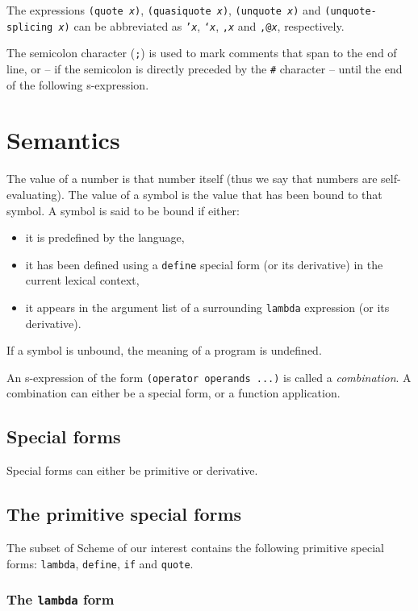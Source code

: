 The expressions \texttt{(quote \textit{x})},
\texttt{(quasiquote \textit{x})}, \texttt{(unquote \textit{x})}
and \texttt{(unquote\--splicing \textit{x})} can be abbreviated
as \texttt{'\textit{x}}, \texttt{`\textit{x}}, \texttt{,\textit{x}}
and \texttt{,@\textit{x}}, respectively.

The semicolon character (\texttt{;}) is used to mark comments that span to the
end of line, or -- if the semicolon is directly preceded by the \texttt{\#}
character -- until the end of the following s-expression.

\section{Semantics}

The value of a number is that number itself (thus we say that numbers
are self-evaluating). The value of a symbol is the value that has been
bound to that symbol. A symbol is said to be bound if either:
\begin{itemize}
\item it is predefined by the language,
\item it has been defined using a \texttt{define} special form (or
  its derivative) in the current lexical context,
\item it appears in the argument list of a surrounding \texttt{lambda}
  expression (or its derivative).
\end{itemize}
If a symbol is unbound, the meaning of a program is undefined.

An s-expression of the form \texttt{(operator operands ...)}
is called a \textit{combination}. A combination can either
be a special form, or a function application.

\subsection{Special forms}

Special forms can either be primitive or derivative.

\subsection{The primitive special forms}

The subset of Scheme of our interest contains the following
primitive special forms:
\texttt{lambda}, \texttt{define}, \texttt{if} and \texttt{quote}.

\subsubsection{The \texttt{lambda} form}

